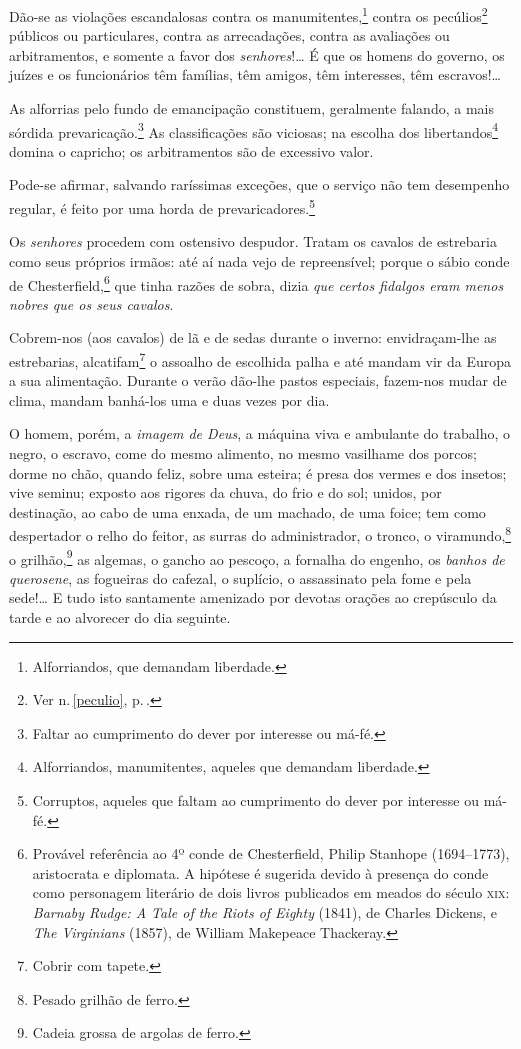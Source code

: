{Dão-se as violações escandalosas contra os manumitentes,\footnote{
  Alforriandos, que demandam liberdade.} contra os pecúlios\footnote{
  Ver n.\,\ref{peculio}, p.\,\pageref{peculio}.} públicos ou particulares, contra
as arrecadações, contra as avaliações ou arbitramentos, e somente a
favor dos \emph{senhores}!\ldots{} É que os homens do governo, os juízes e os
funcionários têm famílias, têm amigos, têm interesses, têm escravos!\ldots{}

As alforrias pelo fundo de emancipação constituem, geralmente falando, a mais sórdida
prevaricação.\footnote{
  Faltar ao cumprimento do dever por interesse ou má-fé.} As
classificações são viciosas; na escolha dos libertandos\footnote{
  Alforriandos, manumitentes, aqueles que demandam liberdade.} domina o
capricho; os arbitramentos são de excessivo valor.

Pode-se afirmar, salvando raríssimas exceções, que o serviço não tem
desempenho regular, é feito por uma horda de prevaricadores.\footnote{
  Corruptos, aqueles que   faltam ao cumprimento do dever por interesse ou má-fé.}

Os \emph{senhores} procedem com ostensivo despudor. Tratam os cavalos de
estrebaria como seus próprios irmãos: até aí nada vejo de repreensível;
porque o sábio conde de Chesterfield,\footnote{Provável referência ao
 4º conde de Chesterfield, Philip Stanhope (1694--1773), aristocrata e
 diplomata. A hipótese é sugerida devido à presença do conde como
  personagem literário de dois livros publicados em meados do século
  \textsc{xix}: \emph{Barnaby Rudge: A Tale of the Riots of Eighty} (1841), de
  Charles Dickens, e \emph{The Virginians} (1857), de William Makepeace 
  Thackeray.} que tinha razões de sobra, dizia \emph{que certos fidalgos
eram menos nobres que os seus cavalos}.

Cobrem-nos (aos cavalos) de lã e de sedas durante o inverno: %
envidraçam-lhe as estrebarias, alcatifam\footnote{Cobrir com tapete.}
o assoalho de escolhida palha e até mandam vir da Europa a sua
alimentação. Durante o verão dão-lhe pastos especiais, fazem-nos mudar
de clima, mandam banhá-los uma e duas vezes por dia.

O homem, porém, a \emph{imagem de Deus}, a máquina viva e ambulante do
trabalho, o negro, o escravo, come do mesmo alimento, no mesmo vasilhame
dos porcos; dorme no chão, quando feliz, sobre uma esteira; é presa dos
vermes e dos insetos; vive seminu; exposto aos rigores da chuva, do
frio e do sol; unidos, por destinação, ao cabo de uma enxada, de um
machado, de uma foice; tem como despertador o relho do feitor, as surras
do administrador, o tronco, o viramundo,\footnote{Pesado grilhão de
  ferro.} o grilhão,\footnote{Cadeia grossa de argolas de ferro.} as
algemas, o gancho ao pescoço, a fornalha do engenho, os \emph{banhos de
querosene}, as fogueiras do cafezal, o suplício, o assassinato pela fome
e pela sede!\ldots{} E tudo isto santamente amenizado por devotas orações ao
crepúsculo da tarde e ao alvorecer do dia seguinte.

}
